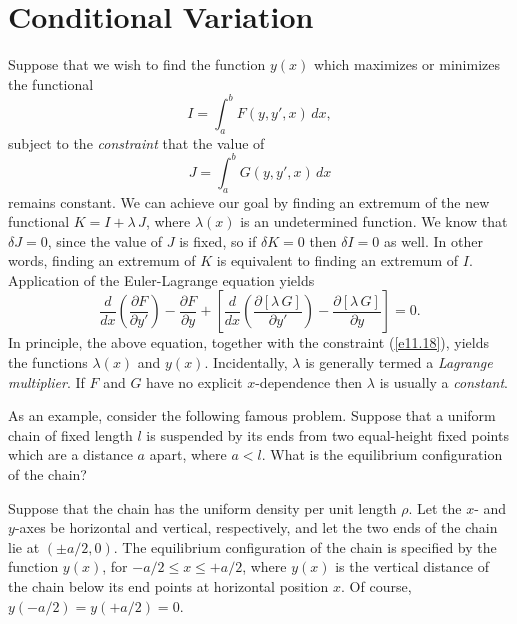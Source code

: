 \section{Conditional Variation}
Suppose that we wish to find the function $y(x)$ which
maximizes or minimizes the functional
\begin{equation}
I = \int_a^b F(y, y',x)\,dx,
\end{equation}
subject to the {\em  constraint}\/ that the value of
\begin{equation}\label{e11.18}
J = \int_a^b G(y,y',x)\,dx
\end{equation}
remains constant. We can achieve our goal by finding an  extremum of the new functional
$K = I + \lambda\,J$, where $\lambda(x)$ is an undetermined function. We know
that $\delta J = 0$, since the value of $J$ is fixed, so if $\delta K= 0$ then
$\delta I = 0$ as well. In other words, finding an extremum of $K$ is equivalent
to finding an extremum of $I$. Application of the Euler-Lagrange
equation yields
\begin{equation}
\frac{d}{dx}\!\left(\frac{\partial F}{\partial y'}\right)-\frac{\partial F}{\partial y} +\left[\frac{d}{dx}\!\left(\frac{\partial [\lambda\,G]}{\partial y'}\right)-\frac{\partial [\lambda\,G]}{\partial y}\right]= 0.
\end{equation}
In principle, the above equation, together with the constraint (\ref{e11.18}),
yields the  functions $\lambda(x)$ and  $y(x)$. Incidentally,  $\lambda$ is generally
termed a {\em Lagrange multiplier}.  If $F$ and $G$ have no explicit $x$-dependence then $\lambda$ is usually a {\em constant}.

As an example, consider the following famous problem. Suppose that a uniform
chain of fixed length $l$ is suspended by its ends from
two equal-height fixed points which are a distance $a$ apart, where $a < l$. 
What is the equilibrium configuration of the chain?

Suppose that the chain has the uniform density per unit length $\rho$. 
Let the $x$- and $y$-axes be horizontal and vertical, respectively, and
let the two ends of the chain lie at $(\pm a/2, 0)$. The equilibrium configuration of the chain is specified by the function $y(x)$, for $-a/2\leq x \leq +a/2$, where
$y(x)$ is the vertical distance of the chain below its end points at horizontal
position $x$. Of course, $y(-a/2) = y(+a/2) = 0$. 

